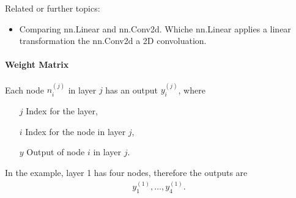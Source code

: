 Related or further topics:
\begin{itemize}
	\item Comparing nn.Linear and nn.Conv2d. Whiche nn.Linear applies a linear transformation the nn.Conv2d a 2D convoluation. %
\end{itemize}

\paragraph{Weight Matrix}
Each node $n^{(j)}_i$ in layer $j$ has an output $y^{(j)}_i$, where 
\begin{itemize}
    \item[$j$] Index for the layer,
    \item[$i$] Index for the node in layer $j$,
    \item[$y$] Output of node $i$ in layer $j$.
\end{itemize}

In the example, layer 1 has four nodes, therefore the outputs are
\begin{align}
    y^{(1)}_1, \dots, y^{(1)}_4.
\end{align}

